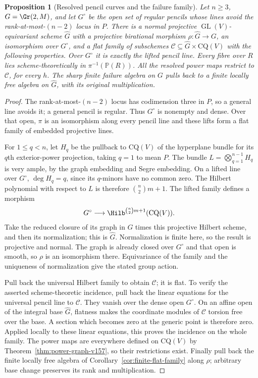 \documentclass[11pt,reqno]{amsart}
\numberwithin{equation}{section}
\newtheorem{proposition}[theorem]{Proposition}
\theoremstyle{definition}\newtheorem{definition}[theorem]{Definition}
\theoremstyle{remark}\newtheorem{remark}[theorem]{Remark}
\newcommand{\Pj}{\mathbb P}\newcommand{\A}{\mathbb A}
\begin{document}
\begin{proposition}[Resolved pencil curves and the failure family]
\label{prop:pencil-compactification-v157}
Let $n\geq3$, $G=\Gr(2,M)$, and let $G^\circ$ be the open set of
regular pencils whose lines avoid the rank-at-most-$(n-2)$ locus in
$P$. There is a normal projective $\operatorname{GL}(V)$-equivariant
scheme $\widehat G$ with a projective birational morphism
$\rho:\widehat G\to G$, an isomorphism over $G^\circ$, and a flat
family of subschemes
$\mathcal C\subseteq\widehat G\times\mathrm{CQ}(V)$ with the following
properties. Over $G^\circ$ it is exactly the lifted pencil line. Every
fibre over $R$ lies scheme-theoretically in $\pi^{-1}(\Pj(R))$.
All the resolved power maps restrict to $\mathcal C$, for every $h$.
The sharp finite failure algebra on $G$ pulls back to a finite locally
free algebra on $\widehat G$, with its original multiplication.
\end{proposition}
\begin{proof}
The rank-at-most-$(n-2)$ locus has codimension three in $P$, so a general
line avoids it; a general pencil is regular. Thus $G^\circ$ is nonempty
and dense. Over that open, $\pi$ is an isomorphism along every pencil
line and these lifts form a flat family of embedded projective lines.

For $1\leq q<n$, let $H_q$ be the pullback to $\mathrm{CQ}(V)$ of the
hyperplane bundle for its $q$th exterior-power projection, taking $q=1$
to mean $P$. The bundle $L=\bigotimes_{q=1}^{n-1}H_q$ is very ample,
by the graph embedding and Segre embedding. On a lifted line over
$G^\circ$, $\deg H_q=q$, since its $q$-minors have no common zero.
The Hilbert polynomial with respect to $L$ is therefore
$\binom n2 m+1$. The lifted family defines a morphism
\[
 G^\circ\longrightarrow
       \Hilb^{\binom n2 m+1}(\mathrm{CQ}(V)).
\]
Take the reduced closure of its graph in $G$ times this projective
Hilbert scheme, and then its normalization; this is $\widehat G$.
Normalization is finite here, so the result is projective and normal.
The graph is already closed over $G^\circ$ and that open is smooth,
so $\rho$ is an isomorphism there. Equivariance of the family and the
uniqueness of normalization give the stated group action.

Pull back the universal Hilbert family to obtain $\mathcal C$; it is
flat. To verify the asserted scheme-theoretic incidence, pull back
the linear equations for the universal pencil line to $\mathcal C$.
They vanish over the dense open $G^\circ$. On an affine open of the
integral base $\widehat G$, flatness makes the coordinate modules of
$\mathcal C$ torsion free over the base. A section which becomes zero
at the generic point is therefore zero. Applied locally to these
linear equations, this proves the incidence on the whole family.
The power maps are everywhere defined on $\mathrm{CQ}(V)$ by
Theorem~\ref{thm:power-graph-v157}, so their restrictions exist.
Finally pull back the finite locally free algebra of
Corollary~\ref{cor:finite-flat-family} along $\rho$; arbitrary base
change preserves its rank and multiplication.
\end{proof}
\end{document}
